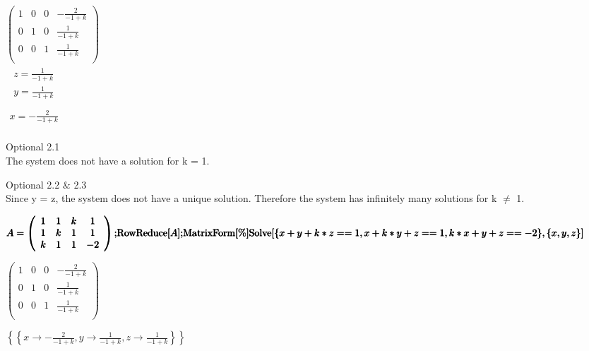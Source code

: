 \documentclass{article}
\begin{document}
\Rightarrow\) \(\left(
\begin{array}{cccc}
 1 & 0 & 0 & -\frac{2}{-1+k} \\
 0 & 1 & 0 & \frac{1}{-1+k} \\
 0 & 0 & 1 & \frac{1}{-1+k} \\
\end{array}
\right)\)\\
\(\begin{array}{c}
 
\begin{array}{c}
 z=\frac{1}{-1+k} \\
 y=\frac{1}{-1+k} \\
\end{array}
 \\
 x=-\frac{2}{-1+k} \\
\end{array}\)

Optional 2.1\\
The system does not have a solution for k = 1.

Optional 2.2 $\&$ 2.3\\
Since y = z, the system does not have a unique solution. Therefore the system has infinitely many solutions for k $\neq $ 1.

\begin{doublespace}
\noindent\(\pmb{A=\left(
\begin{array}{cccc}
 1 & 1 & k & 1 \\
 1 & k & 1 & 1 \\
 k & 1 & 1 & -2 \\
\end{array}
\right);}\\
\pmb{\text{RowReduce}[A];}\\
\pmb{\text{MatrixForm}[\%]}\\
\pmb{\text{Solve}[\{x+y+k*z==1,x+k*y+z==1,k*x+y+z==-2\},\{x,y,z\}]}\)
\end{doublespace}

\begin{doublespace}
\noindent\(\left(
\begin{array}{cccc}
 1 & 0 & 0 & -\frac{2}{-1+k} \\
 0 & 1 & 0 & \frac{1}{-1+k} \\
 0 & 0 & 1 & \frac{1}{-1+k} \\
\end{array}
\right)\)
\end{doublespace}

\begin{doublespace}
\noindent\(\left\{\left\{x\to -\frac{2}{-1+k},y\to \frac{1}{-1+k},z\to \frac{1}{-1+k}\right\}\right\}\)
\end{doublespace}
\end{document}
